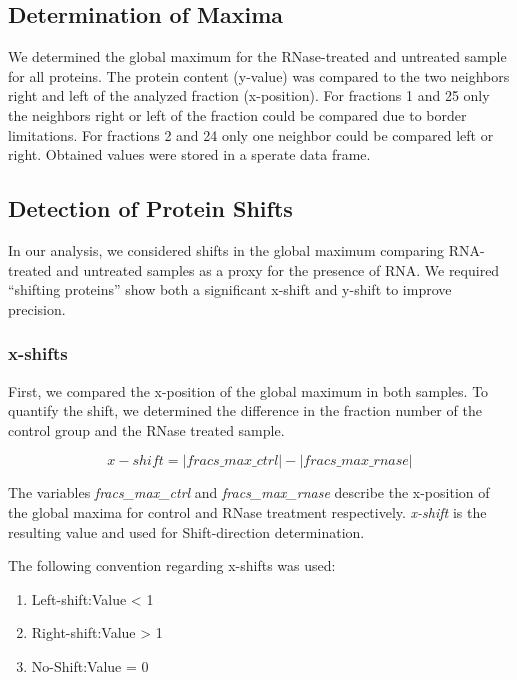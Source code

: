 \documentclass[
]{article}
\begin{document}
\hypertarget{determination-of-maxima}{%
\subsection{Determination of Maxima}\label{determination-of-maxima}}

We determined the global maximum for the RNase-treated and untreated
sample for all proteins. The protein content (y-value) was compared to
the two neighbors right and left of the analyzed fraction (x-position).
For fractions 1 and 25 only the neighbors right or left of the fraction
could be compared due to border limitations. For fractions 2 and 24 only
one neighbor could be compared left or right. Obtained values were
stored in a sperate data frame.

\hypertarget{detection-of-protein-shifts}{%
\subsection{Detection of Protein
Shifts}\label{detection-of-protein-shifts}}

In our analysis, we considered shifts in the global maximum comparing
RNA-treated and untreated samples as a proxy for the presence of RNA. We
required ``shifting proteins'' show both a significant x-shift and
y-shift to improve precision.

\hypertarget{x-shifts}{%
\subsubsection{x-shifts}\label{x-shifts}}

First, we compared the x-position of the global maximum in both samples.
To quantify the shift, we determined the difference in the fraction
number of the control group and the RNase treated sample.

\[x-shift = |fracs\_max\_ctrl| - |fracs\_max\_rnase|\]

The variables \emph{fracs\_max\_ctrl} and \emph{fracs\_max\_rnase}
describe the x-position of the global maxima for control and RNase
treatment respectively. \emph{x-shift} is the resulting value and used
for Shift-direction determination.

The following convention regarding x-shifts was used:

\begin{enumerate}
\def\labelenumi{\arabic{enumi}.}
\item
  Left-shift:\tab    Value \textless{} 1
\item
  Right-shift:\tab   Value \textgreater{} 1
\item
  No-Shift:\tab      Value = 0
\end{enumerate}
\end{document}
